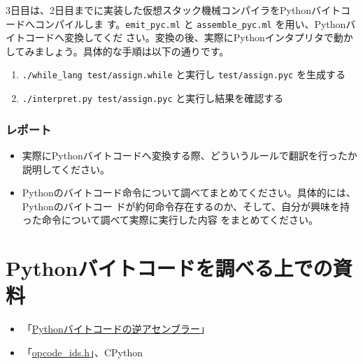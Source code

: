 \documentclass[a4paper,11pt]{jsarticle}
\begin{document}
3日目は、2日目までに実装した仮想スタック機械コンパイラをPythonバイトコードへコンパイルしま
す。\verb|emit_pyc.ml| と \verb|assemble_pyc.ml| を用い、Pythonバイトコードへ変換してくだ
さい。変換の後、実際にPythonインタプリタで動かしてみましょう。具体的な手順は以下の通りです。

\begin{enumerate}
\item \verb|./while_lang test/assign.while| と実行し \verb|test/assign.pyc| を生成する
\item \verb|./interpret.py test/assign.pyc| と実行し結果を確認する
\end{enumerate}

\subsubsection{レポート}

\begin{itemize}
\item 実際にPythonバイトコードへ変換する際、どういうルールで翻訳を行ったか説明してください。
\item Pythonのバイトコード命令について調べてまとめてください。具体的には、Pythonのバイトコー
  ドが約何命令存在するのか、そして、自分が興味を持った命令について調べて実際に実行した内容
  をまとめてください。
\end{itemize}

\section{Pythonバイトコードを調べる上での資料}

\begin{itemize}
\item 「\href{https://docs.python.org/ja/3/library/dis.html}{Pythonバイトコードの逆アセンブラー}」
\item 「\href{https://github.com/python/cpython/blob/main/Include/opcode_ids.h}{opcode\_ids.h}」、CPython
\end{itemize}
\end{document}
